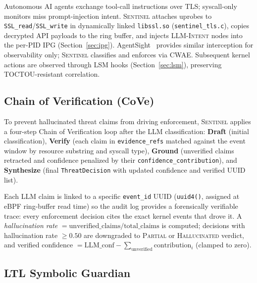 \documentclass[journal]{IEEEtran}
\newcommand{\sentinel}{\textsc{Sentinel}}
\newcommand{\ipg}{IPG}
\newcommand{\cwae}{CWAE}
\begin{document}
Autonomous AI agents exchange tool-call instructions over TLS; syscall-only
monitors miss prompt-injection intent.  \sentinel{} attaches uprobes to
\texttt{SSL\_read}/\texttt{SSL\_write} in dynamically linked \texttt{libssl.so}
(\texttt{sentinel\_tls.c}), copies decrypted API payloads to the ring buffer,
and injects \textsc{LLM-Intent} nodes into the per-PID \ipg{}
(Section~\ref{sec:ipg}).  AgentSight~\cite{agentsight} provides
similar interception for observability only; \sentinel{} classifies and enforces
via \cwae{}.  Subsequent kernel actions are observed through LSM hooks
(Section~\ref{sec:lsm}), preserving TOCTOU-resistant correlation.

\subsection{Chain of Verification (CoVe)}\label{sec:cove}

To prevent hallucinated threat claims from driving enforcement, \sentinel{}
applies a four-step Chain of Verification loop after the LLM classification:
\textbf{Draft} (initial classification), \textbf{Verify} (each claim in
\texttt{evidence\_refs} matched against the event window by resource substring
and syscall type), \textbf{Ground} (unverified claims retracted and confidence
penalized by their \texttt{confidence\_contribution}), and \textbf{Synthesize}
(final \texttt{ThreatDecision} with updated confidence and verified UUID list).

Each LLM claim is linked to a specific \texttt{event\_id} UUID
(\texttt{uuid4()}, assigned at eBPF ring-buffer read time) so the audit log
provides a forensically verifiable trace: every enforcement decision cites the
exact kernel events that drove it.  A \emph{hallucination rate}
$= \text{unverified\_claims}/\text{total\_claims}$ is computed; decisions with
hallucination rate $\geq 0.50$ are downgraded to \textsc{Partial} or
\textsc{Hallucinated} verdict, and verified confidence
$= \text{LLM\_conf} - \sum_{\text{unverified}} \text{contribution}_i$
(clamped to zero).

\subsection{LTL Symbolic Guardian}\label{sec:ltl}
\end{document}
